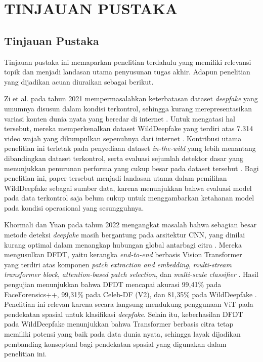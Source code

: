 \newpage
\chapter{TINJAUAN PUSTAKA} \label{Bab II}

\section{Tinjauan Pustaka} \label{II.Tinjauan}
Tinjauan pustaka ini memaparkan penelitian terdahulu yang memiliki relevansi topik dan menjadi landasan utama penyusunan tugas akhir. Adapun penelitian yang dijadikan acuan diuraikan sebagai berikut. \par

Zi et al. pada tahun 2021 mempermasalahkan keterbatasan dataset \textit{deepfake} yang umumnya disusun dalam kondisi terkontrol, sehingga kurang merepresentasikan variasi konten dunia nyata yang beredar di internet \cite{Zi2024}. Untuk mengatasi hal tersebut, mereka memperkenalkan dataset WildDeepfake yang terdiri atas 7.314 video wajah yang dikumpulkan sepenuhnya dari internet \cite{Zi2024}. Kontribusi utama penelitian ini terletak pada penyediaan dataset \textit{in-the-wild} yang lebih menantang dibandingkan dataset terkontrol, serta evaluasi sejumlah detektor dasar yang menunjukkan penurunan performa yang cukup besar pada dataset tersebut \cite{Zi2024}. Bagi penelitian ini, paper tersebut menjadi landasan utama dalam pemilihan WildDeepfake sebagai sumber data, karena menunjukkan bahwa evaluasi model pada data terkontrol saja belum cukup untuk menggambarkan ketahanan model pada kondisi operasional yang sesungguhnya. \par

Khormali dan Yuan pada tahun 2022 mengangkat masalah bahwa sebagian besar metode deteksi \textit{deepfake} masih bergantung pada arsitektur CNN, yang dinilai kurang optimal dalam menangkap hubungan global antarbagi citra \cite{app12062953}. Mereka mengusulkan DFDT, yaitu kerangka \textit{end-to-end} berbasis Vision Transformer yang terdiri atas komponen \textit{patch extraction and embedding}, \textit{multi-stream transformer block}, \textit{attention-based patch selection}, dan \textit{multi-scale classifier} \cite{app12062953}. Hasil pengujian menunjukkan bahwa DFDT mencapai akurasi 99,41\% pada FaceForensics++, 99,31\% pada Celeb-DF (V2), dan 81,35\% pada WildDeepfake \cite{app12062953}. Penelitian ini relevan karena secara langsung mendukung penggunaan ViT pada pendekatan spasial untuk klasifikasi \textit{deepfake}. Selain itu, keberhasilan DFDT pada WildDeepfake menunjukkan bahwa Transformer berbasis citra tetap memiliki potensi yang baik pada data dunia nyata, sehingga layak dijadikan pembanding konseptual bagi pendekatan spasial yang digunakan dalam penelitian ini. \par

